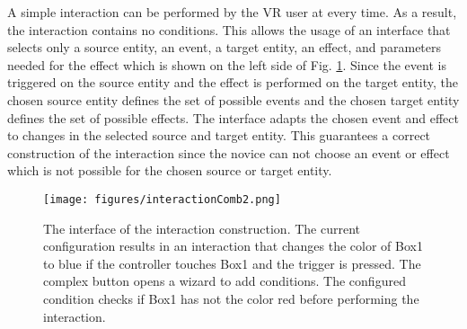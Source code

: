 \documentclass[conference]{IEEEtran}
\begin{document}
A simple interaction can be performed by the \ac{VR} user at every time. As a result, the interaction contains no conditions. This allows the usage of an interface that selects only a source entity, an event, a target entity, an effect, and parameters needed for the effect which is shown on the left side of Fig. \ref{specifaction}. Since the event is triggered on the source entity and the effect is performed on the target entity, the chosen source entity defines the set of possible events and the chosen target entity defines the set of possible effects. The interface adapts the chosen event and effect to changes in the selected source and target entity. This guarantees a correct construction of the interaction since the novice can not choose an event or effect which is not possible for the chosen source or target entity.

\begin{figure}[htbp]
\centerline{\texttt{[image: figures/interactionComb2.png]}}
\caption{The interface of the interaction construction. The current configuration results in an interaction that changes the color of Box1 to blue if the controller touches Box1 and the trigger is pressed. The complex button opens a wizard to add conditions. The configured condition checks if Box1 has not the color red before performing the interaction.}
\label{specifaction}
\end{figure}
\end{document}
